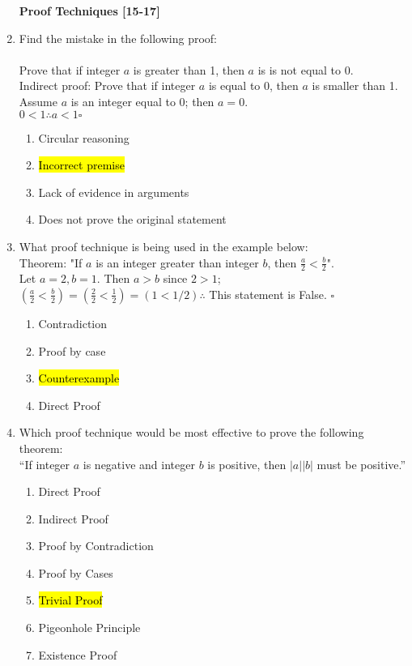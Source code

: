 \documentclass{article}
\begin{document}
\begin{enumerate}
\newpage

\textbf{Proof Techniques [15-17]}

\item Find the mistake in the following proof:\\\\
Prove that if integer $a$ is greater than 1, then $a$ is is not equal to 0.
\\Indirect proof: Prove that if integer $a$ is equal to 0, then $a$ is smaller than 1.
\\Assume $a$ is an integer equal to 0; then $a=0.$
\\$0<1$\quad $\therefore a<1$\hfill $\square$
\begin{enumerate}
\item Circular reasoning
\item \hl{Incorrect premise}
\item Lack of evidence in arguments
\item Does not prove the original statement
\end{enumerate}

\item What proof technique is being used in the example below:\\
Theorem: "If $a$ is an integer greater than integer $b$, then $\frac{a}{2}<\frac{b}{2}$".\\
Let $a=2, b=1$. Then $a>b$ since $2>1$;\\
$(\frac{a}{2}<\frac{b}{2})=(\frac{2}{2}<\frac{1}{2})=(1<1/2)$\quad $\therefore$ This statement is False.
\hfill $\square$
\begin{enumerate}
\item Contradiction
\item Proof by case
\item \hl{Counterexample}
\item Direct Proof
\end{enumerate}

\item Which proof technique would be most effective to prove the following theorem:\\
``If integer $a$ is negative and integer $b$ is positive, then $|a||b|$ must be positive.''
\begin{enumerate}
\item Direct Proof
\item Indirect Proof
\item Proof by Contradiction
\item Proof by Cases
\item \hl{Trivial Proof}
\item Pigeonhole Principle
\item Existence Proof
\end{enumerate}


\end{enumerate}
\end{document}

